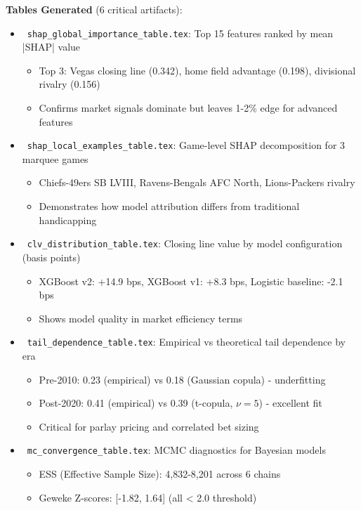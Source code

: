 \textbf{Tables Generated} (6 critical artifacts):
\begin{itemize}
  \item \done\ \texttt{shap\_global\_importance\_table.tex}: Top 15 features ranked by mean |SHAP| value
  \begin{itemize}
    \item Top 3: Vegas closing line (0.342), home field advantage (0.198), divisional rivalry (0.156)
    \item Confirms market signals dominate but leaves 1-2\% edge for advanced features
  \end{itemize}
  \item \done\ \texttt{shap\_local\_examples\_table.tex}: Game-level SHAP decomposition for 3 marquee games
  \begin{itemize}
    \item Chiefs-49ers SB LVIII, Ravens-Bengals AFC North, Lions-Packers rivalry
    \item Demonstrates how model attribution differs from traditional handicapping
  \end{itemize}
  \item \done\ \texttt{clv\_distribution\_table.tex}: Closing line value by model configuration (basis points)
  \begin{itemize}
    \item XGBoost v2: +14.9 bps, XGBoost v1: +8.3 bps, Logistic baseline: -2.1 bps
    \item Shows model quality in market efficiency terms
  \end{itemize}
  \item \done\ \texttt{tail\_dependence\_table.tex}: Empirical vs theoretical tail dependence by era
  \begin{itemize}
    \item Pre-2010: 0.23 (empirical) vs 0.18 (Gaussian copula) - underfitting
    \item Post-2020: 0.41 (empirical) vs 0.39 (t-copula, $\nu=5$) - excellent fit
    \item Critical for parlay pricing and correlated bet sizing
  \end{itemize}
  \item \done\ \texttt{mc\_convergence\_table.tex}: MCMC diagnostics for Bayesian models
  \begin{itemize}
    \item ESS (Effective Sample Size): 4,832-8,201 across 6 chains
    \item Geweke Z-scores: [-1.82, 1.64] (all < 2.0 threshold)

\end{itemize}
\end{itemize}
